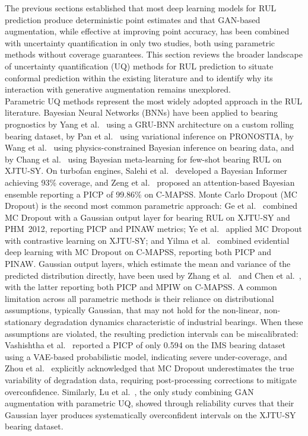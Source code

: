 The previous sections established that most deep learning models for RUL
prediction produce deterministic point estimates and that
GAN-based augmentation, while effective at improving point accuracy,
has been combined with uncertainty quantification in only two studies,
both using parametric methods without coverage guarantees. This section
reviews the broader landscape of uncertainty quantification (UQ)
methods for RUL prediction to situate conformal prediction within the
existing literature and to identify why its interaction with generative
augmentation remains unexplored.\\

Parametric UQ methods represent the most widely adopted approach in
the RUL literature. Bayesian Neural Networks (BNNs) have been applied
to bearing prognostics by Yang et al.~\cite{10854686} using a
GRU-BNN architecture on a custom rolling bearing dataset, by
Pan et al.~\cite{pan_two-stage_2025} using variational inference on
PRONOSTIA, by Wang et al.~\cite{wang_physics-constrained_2026} using
physics-constrained Bayesian inference on bearing data, and by
Chang et al.~\cite{chang_few-shot_2025} using Bayesian
meta-learning for few-shot bearing RUL on XJTU-SY. On turbofan
engines, Salehi et al.~\cite{salehi_bayesian_2026} developed a
Bayesian Informer achieving 93\% coverage, and
Zeng et al.~\cite{zeng_2026} proposed an attention-based Bayesian
ensemble reporting a PICP of 99.86\% on C-MAPSS. Monte Carlo Dropout
(MC Dropout) is the second most common parametric approach:
Ge et al.~\cite{ge_bearing_2025} combined MC Dropout with a Gaussian
output layer for bearing RUL on XJTU-SY and PHM~2012, reporting PICP
and PINAW metrics;
Ye et al.~\cite{11131520} applied MC Dropout with contrastive
learning on XJTU-SY; and
Yilma et al.~\cite{yilma_deep_2026} combined evidential deep
learning with MC Dropout on C-MAPSS, reporting both PICP and PINAW.
Gaussian output layers, which estimate the mean and variance of the
predicted distribution directly, have been used by
Zhang et al.~\cite{11398369} and
Chen et al.~\cite{chen_probabilistic_2026}, with the latter
reporting both PICP and MPIW on C-MAPSS. A common limitation across
all parametric methods is their reliance on distributional
assumptions, typically Gaussian, that may not hold for the
non-linear, non-stationary degradation dynamics characteristic of
industrial bearings. When these assumptions are violated, the
resulting prediction intervals can be miscalibrated:
Vashishtha et al.~\cite{s26072230} reported a PICP of only 0.594
on the IMS bearing dataset using a VAE-based probabilistic model,
indicating severe under-coverage, and
Zhou et al.~\cite{zhou_self-attention_2026} explicitly acknowledged
that MC Dropout underestimates the true variability of degradation
data, requiring post-processing corrections to mitigate
overconfidence. Similarly, Lu et al.~\cite{lu_joint_2022}, the only
study combining GAN augmentation with parametric UQ, showed through
reliability curves that their Gaussian layer produces systematically
overconfident intervals on the XJTU-SY bearing dataset.\\

